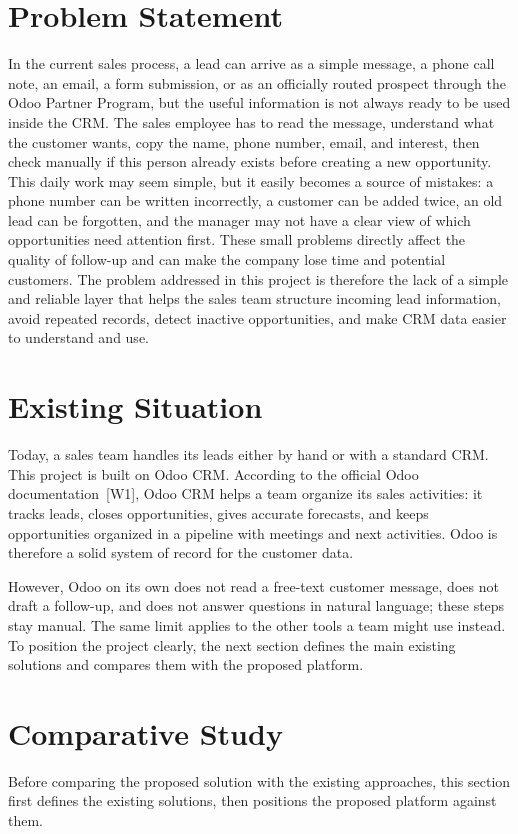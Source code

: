 \documentclass[12pt,a4paper,oneside]{report}
\begin{document}
\section{Problem Statement}\label{sumlbl:c1s2}
In the current sales process, a lead can arrive as a simple message, a phone call note, an email, a form submission, or as an officially routed prospect through the Odoo Partner Program, but the useful information is not always ready to be used inside the CRM. The sales employee has to read the message, understand what the customer wants, copy the name, phone number, email, and interest, then check manually if this person already exists before creating a new opportunity. This daily work may seem simple, but it easily becomes a source of mistakes: a phone number can be written incorrectly, a customer can be added twice, an old lead can be forgotten, and the manager may not have a clear view of which opportunities need attention first. These small problems directly affect the quality of follow-up and can make the company lose time and potential customers. The problem addressed in this project is therefore the lack of a simple and reliable layer that helps the sales team structure incoming lead information, avoid repeated records, detect inactive opportunities, and make CRM data easier to understand and use.

\section{Existing Situation}\label{sumlbl:c1s3}
Today, a sales team handles its leads either by hand or with a standard CRM. This project is built on Odoo CRM. According to the official Odoo documentation~\textup{[W1]}, Odoo CRM helps a team organize its sales activities: it tracks leads, closes opportunities, gives accurate forecasts, and keeps opportunities organized in a pipeline with meetings and next activities. Odoo is therefore a solid system of record for the customer data.

However, Odoo on its own does not read a free-text customer message, does not draft a follow-up, and does not answer questions in natural language; these steps stay manual. The same limit applies to the other tools a team might use instead. To position the project clearly, the next section defines the main existing solutions and compares them with the proposed platform.



\section{Comparative Study}\label{sumlbl:c1s4}
Before comparing the proposed solution with the existing approaches, this section first defines the existing solutions, then positions the proposed platform against them.
\end{document}

